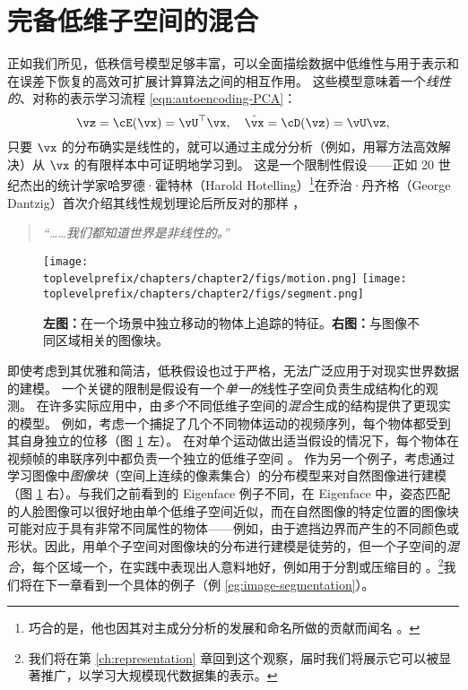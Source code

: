 \documentclass[../../book-main_zh.tex]{subfiles}
\begin{document}
\section{完备低维子空间的混合}%
\label{sec:ica}
正如我们所见，低秩信号模型足够丰富，可以全面描绘数据中低维性与用于表示和在误差下恢复的高效可扩展计算算法之间的相互作用。
这些模型意味着一个\textit{线性的}、对称的表示学习流程 \eqref{eqn:autoencoding-PCA}：
\begin{equation*}
    \vz = \cE(\vx) = \vU^\top \vx, \quad \hat{\vx} = \cD(\vz) = \vU \vz,
\end{equation*}
只要 $\vx$ 的分布确实是线性的，就可以通过主成分分析（例如，用幂方法高效解决）从 $\vx$ 的有限样本中可证明地学习到。
这是一个限制性假设——正如 20 世纪杰出的统计学家哈罗德·霍特林（Harold Hotelling）\footnote{巧合的是，他也因其对主成分分析的发展和命名所做的贡献而闻名 \cite{Hotelling1933}。}在乔治·丹齐格（George Dantzig）首次介绍其线性规划理论后所反对的那样 \cite{Dantzig2002-eh}，
\begin{quote}
\centering
    \textit{“……我们都知道世界是非线性的。”}
\end{quote}


\begin{figure}
    \centering
    \texttt{[image: \\toplevelprefix/chapters/chapter2/figs/motion.png]} \hspace{5mm}
    \texttt{[image: \\toplevelprefix/chapters/chapter2/figs/segment.png]} 
    \caption{\textbf{左图：}在一个场景中独立移动的物体上追踪的特征。\textbf{右图：}与图像不同区域相关的图像块。}
    \label{fig:multiple-subspaces}
\end{figure}
即使考虑到其优雅和简洁，低秩假设也过于严格，无法广泛应用于对现实世界数据的建模。
一个关键的限制是假设有一个\textit{单一的}线性子空间负责生成结构化的观测。
在许多实际应用中，由\textit{多个}不同低维子空间的\textit{混合}生成的结构提供了更现实的模型。
例如，考虑一个捕捉了几个不同物体运动的视频序列，每个物体都受到其自身独立的位移（图 \ref{fig:multiple-subspaces} 左）。
在对单个运动做出适当假设的情况下，每个物体在视频帧的串联序列中都负责一个独立的低维子空间 \cite{VidalR2004-ECCV}。
作为另一个例子，考虑通过学习图像中\textit{图像块}（空间上连续的像素集合）的分布模型来对自然图像进行建模（图 \ref{fig:multiple-subspaces} 右）。与我们之前看到的 Eigenface 例子不同，在 Eigenface 中，姿态匹配的人脸图像可以很好地由单个低维子空间近似，而在自然图像的特定位置的图像块可能对应于具有非常不同属性的物体——例如，由于遮挡边界而产生的不同颜色或形状。因此，用单个子空间对图像块的分布进行建模是徒劳的，但一个子空间的\textit{混合}，每个区域一个，在实践中表现出人意料地好，例如用于分割或压缩目的 \cite{Mobahi-IJCV2011}。\footnote{我们将在第 \ref{ch:representation} 章回到这个观察，届时我们将展示它可以被显著推广，以学习大规模现代数据集的表示。}我们将在下一章看到一个具体的例子（例 \ref{eg:image-segmentation}）。
\end{document}
